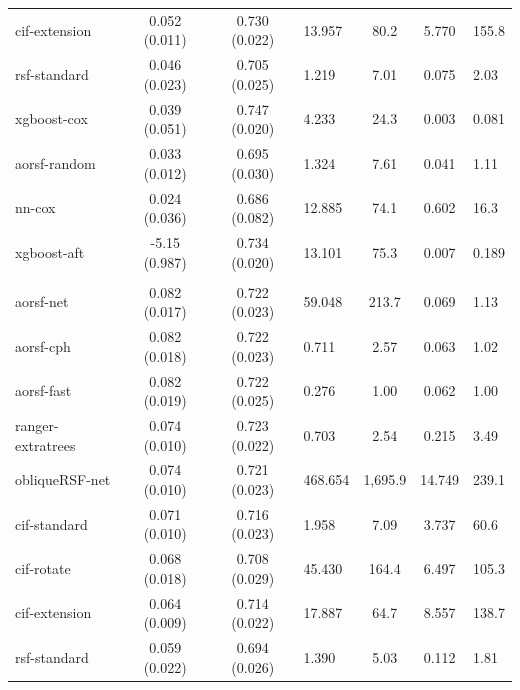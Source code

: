 \documentclass[twoside,11pt]{article}\usepackage[]{graphicx}\usepackage[]{xcolor}
\newenvironment{knitrout}{}{} %
\begin{document}
\begin{knitrout}
\begin{longtable}{lcclccl}
\hspace{1em}cif-extension & 0.052 (0.011) & 0.730 (0.022) & 13.957 & 80.2 & 5.770 & 155.8\\
\hspace{1em}rsf-standard & 0.046 (0.023) & 0.705 (0.025) & 1.219 & 7.01 & 0.075 & 2.03\\
\hspace{1em}xgboost-cox & 0.039 (0.051) & 0.747 (0.020) & 4.233 & 24.3 & 0.003 & 0.081\\
\hspace{1em}aorsf-random & 0.033 (0.012) & 0.695 (0.030) & 1.324 & 7.61 & 0.041 & 1.11\\
\hspace{1em}nn-cox & 0.024 (0.036) & 0.686 (0.082) & 12.885 & 74.1 & 0.602 & 16.3\\
\hspace{1em}xgboost-aft & -5.15 (0.987) & 0.734 (0.020) & 13.101 & 75.3 & 0.007 & 0.189\\
\addlinespace[0.3em]
\hline
\multicolumn{7}{l}{\textit{\textbf{GUIDE-IT; HF hospitalization, n = 894, p = 59}}}\\
\hline
\hspace{1em}aorsf-net & 0.082 (0.017) & 0.722 (0.023) & 59.048 & 213.7 & 0.069 & 1.13\\
\hspace{1em}aorsf-cph & 0.082 (0.018) & 0.722 (0.023) & 0.711 & 2.57 & 0.063 & 1.02\\
\hspace{1em}aorsf-fast & 0.082 (0.019) & 0.722 (0.025) & 0.276 & 1.00 & 0.062 & 1.00\\
\hspace{1em}ranger-extratrees & 0.074 (0.010) & 0.723 (0.022) & 0.703 & 2.54 & 0.215 & 3.49\\
\hspace{1em}obliqueRSF-net & 0.074 (0.010) & 0.721 (0.023) & 468.654 & 1,695.9 & 14.749 & 239.1\\
\hspace{1em}cif-standard & 0.071 (0.010) & 0.716 (0.023) & 1.958 & 7.09 & 3.737 & 60.6\\
\hspace{1em}cif-rotate & 0.068 (0.018) & 0.708 (0.029) & 45.430 & 164.4 & 6.497 & 105.3\\
\hspace{1em}cif-extension & 0.064 (0.009) & 0.714 (0.022) & 17.887 & 64.7 & 8.557 & 138.7\\
\hspace{1em}rsf-standard & 0.059 (0.022) & 0.694 (0.026) & 1.390 & 5.03 & 0.112 & 1.81\\

\end{longtable}
\end{knitrout}
\end{document}

